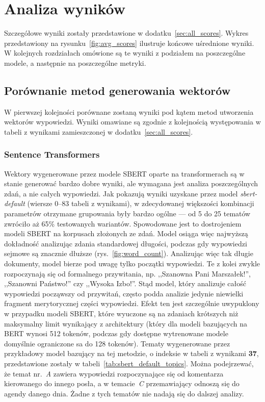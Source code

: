 
\chapter{Analiza wyników}\label{sec:scores_analysis}
	Szczegółowe wyniki zostały przedstawione w dodatku~\ref{sec:all_scores}.
	Wykres przedstawiony na rysunku~\ref{fig:avg_scores} ilustruje końcowe uśrednione wyniki.
	W kolejnych rozdziałach omówione są te wyniki z podziałem na poszczególne modele,
		a następnie na poszczególne metryki.

\section{Porównanie metod generowania wektorów}
	W pierwszej kolejności porównane zostaną wyniki pod kątem metod utworzenia wektorów wypowiedzi.
	Wyniki omawiane są zgodnie z kolejnością występowania w tabeli z wynikami zamieszczonej w dodatku~\ref{sec:all_scores}.

	\subsection{Sentence Transformers}\label{sec:sbert_summary}
		Wektory wygenerowane przez modele SBERT oparte na transformerach są w stanie generować bardzo dobre wyniki,
			ale wymagana jest analiza poszczególnych zdań, a nie całych wypowiedzi.
		Jak pokazują wyniki uzyskane przez model \emph{sbert-default} (wiersze 0--83 tabeli z wynikami),
			w zdecydowanej większości kombinacji parametrów otrzymane grupowania były bardzo ogólne --- od 5 do 25 tematów zwróciło aż 65\% testowanych wariantów.
		Spowodowane jest to dostrojeniem modeli SBERT na korpusach złożonych ze zdań.
		Model osiąga więc najwyższą dokładność analizując zdania standardowej długości, podczas gdy wypowiedzi sejmowe są znacznie dłuższe (rys.~\ref{fig:word_count}).
		Analizując więc tak długie dokumenty, model bierze pod uwagę tylko początki wypowiedzi.
		Te z kolei zwykle rozpoczynają się od formalnego przywitania, np. ,,Szanowna Pani Marszałek!'', ,,Szanowni Państwo!'' czy ,,Wysoka Izbo!''.
		Stąd model, który analizuje całość wypowiedzi począwszy od przywitań, często podda analizie jedynie niewielki fragment merytorycznej części wypowiedzi.
		Efekt ten jest szczególnie uwypuklony w przypadku modeli SBERT, które wyuczone są na zdaniach krótszych niż maksymalny limit wynikający z architektury
			(który dla modeli bazujących na BERT wynosi 512 tokenów, podczas gdy dostępne wytrenowane modele domyślnie ograniczone sa do 128 tokenów).
		Tematy wygenerowane przez przykładowy model bazujący na tej metodzie, o indeksie w tabeli z wynikami \textbf{37}, przedstawione zostały w tabeli~\ref{tab:sbert_default_topics}.
		Można podejrzewać, że temat nr.~\emph{A} zawiera wypowiedzi rozpoczynające się od komentarza kierowanego do innego posła, a w temacie~\emph{C} przemawiający odnoszą się do agendy danego dnia.
		Żadne z tych tematów nie nadają się do dalszej analizy.

